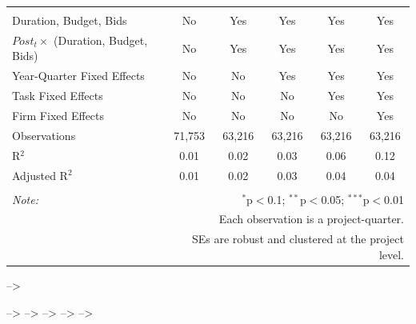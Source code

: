 \documentclass[
]{article}
\begin{document}
\begin{table}[H]
\begin{tabular}{@{\extracolsep{-2pt}}lccccc}
  & & & & & \\ 
\hline \\[-1.8ex] 
Duration, Budget, Bids & No & Yes & Yes & Yes & Yes \\ 
$Post_t \times$  (Duration, Budget, Bids) & No & Yes & Yes & Yes & Yes \\ 
Year-Quarter Fixed Effects & No & No & Yes & Yes & Yes \\ 
Task Fixed Effects & No & No & No & Yes & Yes \\ 
Firm Fixed Effects & No & No & No & No & Yes \\ 
Observations & 71,753 & 63,216 & 63,216 & 63,216 & 63,216 \\ 
R$^{2}$ & 0.01 & 0.02 & 0.03 & 0.06 & 0.12 \\ 
Adjusted R$^{2}$ & 0.01 & 0.02 & 0.03 & 0.04 & 0.04 \\ 
\hline 
\hline \\[-1.8ex] 
\textit{Note:}  & \multicolumn{5}{r}{$^{*}$p$<$0.1; $^{**}$p$<$0.05; $^{***}$p$<$0.01} \\ 
 & \multicolumn{5}{r}{Each observation is a project-quarter.} \\ 
 & \multicolumn{5}{r}{SEs are robust and clustered at the project level.} \\ 
\end{tabular} 
\end{table}

--\textgreater{}

--\textgreater{} --\textgreater{} --\textgreater{} --\textgreater{}
--\textgreater{}
\end{document}
